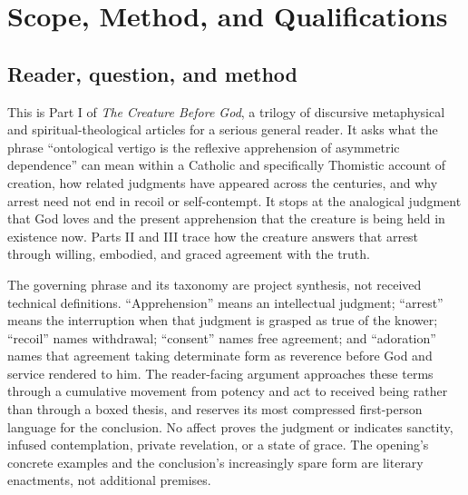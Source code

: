 \section{Scope, Method, and Qualifications}

\subsection{Reader, question, and method}

This is Part I of \emph{The Creature Before God}, a trilogy of discursive metaphysical and spiritual-theological articles for a serious general reader. It asks what the phrase ``ontological vertigo is the reflexive apprehension of asymmetric dependence'' can mean within a Catholic and specifically Thomistic account of creation, how related judgments have appeared across the centuries, and why arrest need not end in recoil or self-contempt. It stops at the analogical judgment that God loves and the present apprehension that the creature is being held in existence now. Parts II and III trace how the creature answers that arrest through willing, embodied, and graced agreement with the truth.

The governing phrase and its taxonomy are project synthesis, not received technical definitions. ``Apprehension'' means an intellectual judgment; ``arrest'' means the interruption when that judgment is grasped as true of the knower; ``recoil'' names withdrawal; ``consent'' names free agreement; and ``adoration'' names that agreement taking determinate form as reverence before God and service rendered to him. The reader-facing argument approaches these terms through a cumulative movement from potency and act to received being rather than through a boxed thesis, and reserves its most compressed first-person language for the conclusion. No affect proves the judgment or indicates sanctity, infused contemplation, private revelation, or a state of grace. The opening's concrete examples and the conclusion's increasingly spare form are literary enactments, not additional premises.

